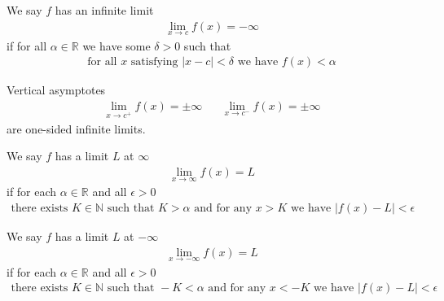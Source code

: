 \begin{definition}
We say $f$ has an infinite limit 
\begin{align*}
    \lim_{x \longrightarrow c} f(x) = -\infty
\end{align*}
if for all $\alpha \in \mathbb{R}$ we have some $\delta > 0$ such that
\begin{align*}
    \text{for all} \hspace{4pt} x \hspace{4pt} \text{satisfying} \hspace{4pt} \lvert x - c \rvert < \delta \hspace{4pt} \text{we have} \hspace{4pt} f(x) < \alpha
\end{align*}
\end{definition}

\begin{recall}
Vertical asymptotes
\begin{align*}
    \lim_{x \longrightarrow c^{+}} f(x) = \pm\infty \hspace{20pt} \lim_{x \longrightarrow c^{-}} f(x) = \pm\infty 
\end{align*}
are one-sided infinite limits.
\end{recall}

\begin{definition}
We say $f$ has a limit $L$ at $\infty$ 
\begin{align*}
    \lim_{x \longrightarrow \infty} f(x) = L
\end{align*}
if for each $\alpha \in \mathbb{R}$ and all $\epsilon > 0$ 
\begin{align*}
    \text{there exists} \hspace{4pt} K \in \mathbb{N} \hspace{4pt} \text{such that} \hspace{4pt} K > \alpha \hspace{4pt} \text{and for any} \hspace{4pt} x > K \hspace{4pt} \text{we have} \hspace{4pt} \lvert f(x) - L \rvert < \epsilon
\end{align*}
\end{definition}

\begin{definition}
We say $f$ has a limit $L$ at $-\infty$ 
\begin{align*}
    \lim_{x \longrightarrow -\infty} f(x) = L
\end{align*}
if for each $\alpha \in \mathbb{R}$ and all $\epsilon > 0$ 
\begin{align*}
    \text{there exists} \hspace{4pt} K \in \mathbb{N} \hspace{4pt} \text{such that} \hspace{4pt} -K < \alpha \hspace{4pt} \text{and for any} \hspace{4pt} x < -K \hspace{4pt} \text{we have} \hspace{4pt} \lvert f(x) - L \rvert < \epsilon
\end{align*}
\end{definition}
